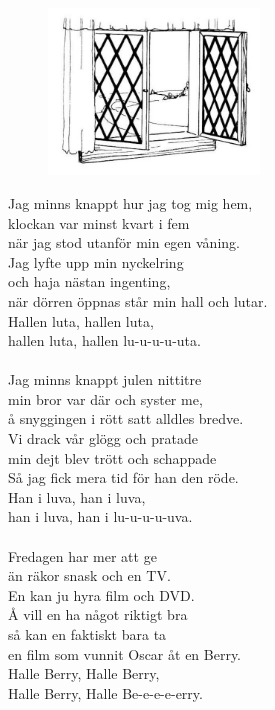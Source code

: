 \documentclass[a6paper, 10pt, twoside]{article}
\begin{document}
\vspace{25pt}
\begin{figure}[!h]
\center
\includegraphics[width=0.5\textwidth]{fonster.png}
\end{figure}

\begin{center}
\end{center}
\vspace{-2pt} %
\begin{lyrics} 
\small Jag minns knappt hur jag tog mig hem, \\
klockan var minst kvart i fem \\
när jag stod utanför min egen våning. \\
Jag lyfte upp min nyckelring \\
och haja nästan ingenting, \\
när dörren öppnas står min hall och lutar. \\
Hallen luta, hallen luta, \\
hallen luta, hallen lu-u-u-u-uta. \\
\vspace{5pt}\\
Jag minns knappt julen nittitre \\
min bror var där och syster me, \\
å snyggingen i rött satt alldles bredve. \\
Vi drack vår glögg och pratade \\
min dejt blev trött och schappade \\
Så jag fick mera tid för han den röde. \\
Han i luva, han i luva, \\
han i luva, han i lu-u-u-u-uva. \\
\vspace{5pt}\\
Fredagen har mer att ge \\
än räkor snask och en TV. \\
En kan ju hyra film och DVD. \\
Å vill en ha något riktigt bra \\
så kan en faktiskt bara ta \\
en film som vunnit Oscar åt en Berry. \\
Halle Berry, Halle Berry, \\
Halle Berry, Halle Be-e-e-e-erry. \\
\end{lyrics}
\end{document}

